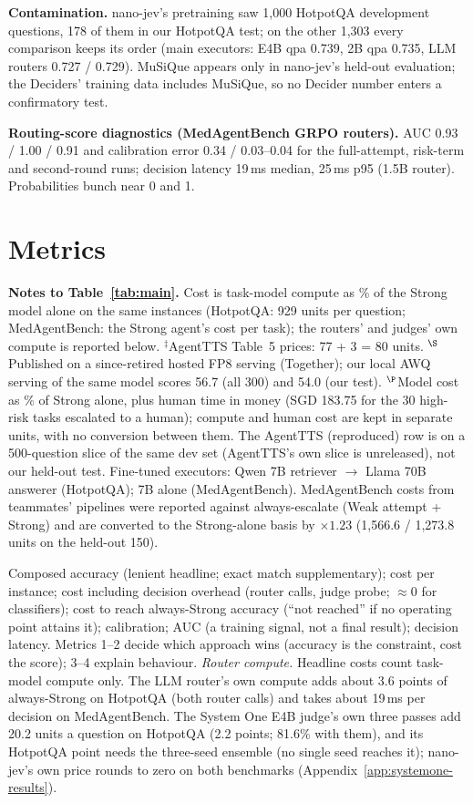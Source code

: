 \documentclass{article}
\begin{document}
\textbf{Contamination.} nano-jev's pretraining saw 1,000 HotpotQA development questions, 178 of them in our HotpotQA test; on the other 1,303 every comparison keeps its order (main executors: E4B qpa 0.739, 2B qpa 0.735, LLM routers 0.727 / 0.729). MuSiQue appears only in nano-jev's held-out evaluation; the Deciders' training data includes MuSiQue, so no Decider number enters a confirmatory test.



\textbf{Routing-score diagnostics (MedAgentBench GRPO routers).} AUC 0.93 / 1.00 / 0.91 and calibration error 0.34 / 0.03--0.04 for the full-attempt, risk-term and second-round runs; decision latency 19\,ms median, 25\,ms p95 (1.5B router). Probabilities bunch near 0 and 1.

\section{Metrics}
\label{app:metrics}
\textbf{Notes to Table~\ref{tab:main}.} Cost is task-model compute as \% of the Strong model alone on the same instances (HotpotQA: 929 units per question; MedAgentBench: the Strong agent's cost per task); the routers' and judges' own compute is reported below. $^\ddagger$AgentTTS Table~5 prices: 77 + 3 = 80 units. $^\S$Published on a since-retired hosted FP8 serving (Together); our local AWQ serving of the same model scores 56.7 (all 300) and 54.0 (our test). $^\P$Model cost as \% of Strong alone, plus human time in money (SGD 183.75 for the 30 high-risk tasks escalated to a human); compute and human cost are kept in separate units, with no conversion between them. The AgentTTS (reproduced) row is on a 500-question slice of the same dev set (AgentTTS's own slice is unreleased), not our held-out test. Fine-tuned executors: Qwen 7B retriever $\to$ Llama 70B answerer (HotpotQA); 7B alone (MedAgentBench). MedAgentBench costs from teammates' pipelines were reported against always-escalate (Weak attempt + Strong) and are converted to the Strong-alone basis by $\times1.23$ (1,566.6 / 1,273.8 units on the held-out 150).

Composed accuracy (lenient headline; exact match supplementary); cost per instance; cost including decision overhead (router calls, judge probe; $\approx0$ for classifiers); cost to reach always-Strong accuracy (``not reached'' if no operating point attains it); calibration; AUC (a training signal, not a final result); decision latency. Metrics 1--2 decide which approach wins (accuracy is the constraint, cost the score); 3--4 explain behaviour. \emph{Router compute.} Headline costs count task-model compute only. The LLM router's own compute adds about 3.6 points of always-Strong on HotpotQA (both router calls) and takes about 19\,ms per decision on MedAgentBench. The System One E4B judge's own three passes add 20.2 units a question on HotpotQA (2.2 points; 81.6\% with them), and its HotpotQA point needs the three-seed ensemble (no single seed reaches it); nano-jev's own price rounds to zero on both benchmarks (Appendix~\ref{app:systemone-results}).
\end{document}
